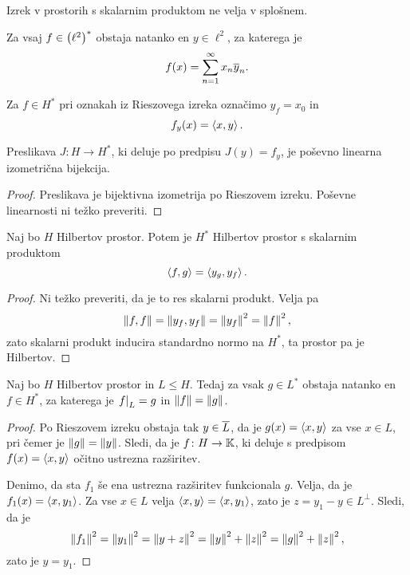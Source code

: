 \begin{opomba}
Izrek v prostorih s skalarnim produktom ne velja v splošnem.
\end{opomba}

\begin{posledica}
Za vsaj $f \in \left(\ell^2\right)^*$ obstaja natanko en $y \in \ell^2$, za
katerega je
\[
f(x) = \sum_{n=1}^\infty x_n \overline{y}_n.
\]
\end{posledica}

\begin{opomba}
Za $f \in H^*$ pri oznakah iz Rieszovega izreka označimo
$y_f = x_0$ in
\[
f_y(x) = \left\langle x,y\right\rangle.
\]
\end{opomba}

\begin{trditev}
Preslikava $J \colon H \to H^*$, ki deluje po predpisu
$J(y) = f_y$, je poševno linearna izometrična bijekcija.
\end{trditev}

\begin{proof}
Preslikava je bijektivna izometrija po Rieszovem izreku. Poševne
linearnosti ni težko preveriti.
\end{proof}

\begin{trditev}
Naj bo $H$ Hilbertov prostor. Potem je $H^*$ Hilbertov prostor s
skalarnim produktom
\[
\left\langle f,g\right\rangle = \left\langle y_g,y_f\right\rangle.
\]
\end{trditev}

\begin{proof}
Ni težko preveriti, da je to res skalarni produkt. Velja pa
\[
\left\lVert f,f\right\rVert = \left\lVert y_f, y_f\right\rVert = \left\lVert y_f\right\rVert^2 = \left\lVert f\right\rVert^2,
\]
zato skalarni produkt inducira standardno normo na $H^*$, ta
prostor pa je Hilbertov.
\end{proof}

\begin{izrek}
Naj bo $H$ Hilbertov prostor in $L \leq H$. Tedaj za vsak
$g \in L^*$ obstaja natanko en $f \in H^*$, za katerega je
$\left. f\right|_{L}^{} = g$ in $\left\lVert f\right\rVert = \left\lVert g\right\rVert$.
\end{izrek}

\begin{proof}
Po Rieszovem izreku obstaja tak $y \in \overline{L}$, da je
$g(x) = \left\langle x,y\right\rangle$ za vse $x \in L$, pri čemer je
$\left\lVert g\right\rVert = \left\lVert y\right\rVert$. Sledi, da je $f \colon H \to \mathbb{K}$, ki deluje
s predpisom $f(x) = \left\langle x,y\right\rangle$ očitno ustrezna razširitev.

Denimo, da sta $f_1$ še ena ustrezna razširitev funkcionala $g$.
Velja, da je $f_1(x) = \left\langle x,y_1\right\rangle$. Za vse $x \in L$ velja
$\left\langle x,y\right\rangle = \left\langle x,y_1\right\rangle$, zato je $z = y_1-y \in L^\bot$. Sledi,
da je
\[
\left\lVert f_1\right\rVert^2 = \left\lVert y_1\right\rVert^2 = \left\lVert y+z\right\rVert^2 =
\left\lVert y\right\rVert^2 + \left\lVert z\right\rVert^2 = \left\lVert g\right\rVert^2 + \left\lVert z\right\rVert^2,
\]
zato je $y = y_1$.
\end{proof}

